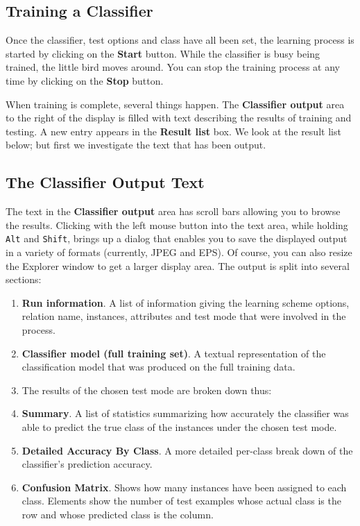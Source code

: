 \documentclass[a4paper]{article}
\begin{document}
\subsection{Training a Classifier}

Once the classifier, test options and class have all been set, the learning
process is started by clicking on the \textbf{Start} button. While the
classifier is busy being trained, the little bird moves around. You can stop
the training process at any time by clicking on the \textbf{Stop} button.

When training is complete, several things happen. The \textbf{Classifier
output} area to the right of the display is filled with text describing the
results of training and testing. A new entry appears in the \textbf{Result
list} box. We look at the result list below; but first we investigate the text
that has been output.

\subsection{The Classifier Output Text}

The text in the \textbf{Classifier output} area has scroll bars allowing you to
browse the results. Clicking with the left mouse button into the text area, 
while holding \texttt{Alt} and \texttt{Shift}, brings up a dialog that enables 
you to save the displayed output in a variety of formats (currently, JPEG and EPS). 
Of course, you can also resize the Explorer window to get a larger display area.  
The output is split into several sections:

\begin{enumerate}
\item \textbf{Run information}.
A list of information giving the learning scheme options, relation name,
instances, attributes and test mode that were involved in the process.
\item \textbf{Classifier model (full training set)}.
A textual representation of the classification model that was produced on the
full training data. 
\item The results of the chosen test mode are broken down thus:
\item \textbf{Summary}.
A list of statistics summarizing how accurately the classifier was able to
predict the true class of the instances under the chosen test mode. 
\item \textbf{Detailed Accuracy By Class}.
A more detailed per-class break down of the classifier's prediction accuracy. 
\item \textbf{Confusion Matrix}.
Shows how many instances have been assigned to each class. Elements show the
number of test examples whose actual class is the row and whose predicted class
is the column.
\end{enumerate}
\end{document}
